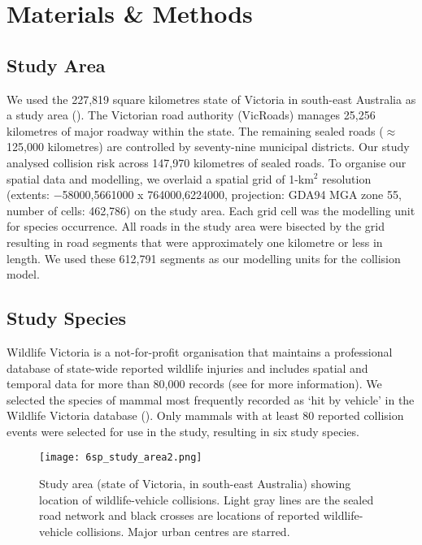 \section{Materials \& Methods}

\subsection{Study Area}

We used the 227,819 square kilometres state of Victoria in south-east Australia as a study area (). The Victorian road authority (VicRoads) manages 25,256 kilometres of major roadway within the state. The remaining sealed roads ($\approx$ 125,000 kilometres) are controlled by seventy-nine municipal districts. Our study analysed collision risk across 147,970 kilometres of sealed roads. To organise our spatial data and modelling, we overlaid a spatial grid of 1-km$^2$ resolution (extents: $-$58000,5661000 x 764000,6224000, projection: GDA94 MGA zone 55, number of cells: 462,786) on the study area. Each grid cell was the modelling unit for species occurrence. All roads in the study area were bisected by the grid resulting in road segments that were approximately one kilometre or less in length. We used these 612,791 segments as our modelling units for the collision model.

\subsection{Study Species}

Wildlife Victoria is a not-for-profit organisation that maintains a professional database of state-wide reported wildlife injuries and includes spatial and temporal data for more than 80,000 records (see  for more information). We selected the species of mammal most frequently recorded as `hit by vehicle' in the Wildlife Victoria database (). Only mammals with at least 80 reported collision events were selected for use in the study, resulting in six study species.

\begin{figure*}[!h]
  \centering
  \texttt{[image: 6sp\_study\_area2.png]}
  \caption[Wildlife-vehicle collisions in Victoria]{Study area (state of Victoria, in south-east Australia) showing location of wildlife-vehicle collisions. Light gray lines are the sealed road network and black crosses are locations of reported wildlife-vehicle collisions. Major urban centres are starred.}
  \label{6sp_study_area}
\end{figure*}

